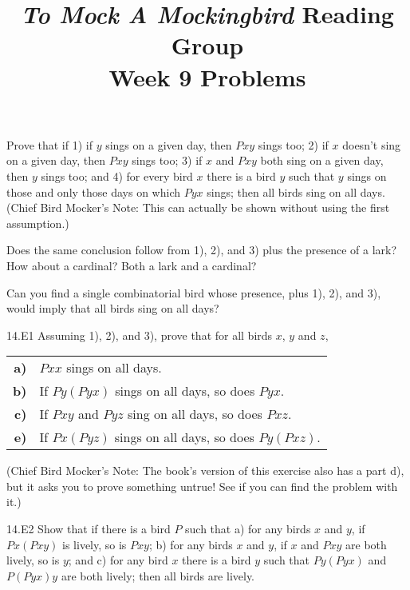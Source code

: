 \documentclass[12pt, letterpaper]{article}
\title{\emph{To Mock A Mockingbird} Reading Group\\Week 9 Problems}
\begin{document}
\maketitle

\begin{prob}{14.1} 
Prove that if 1) if $y$ sings on a given day, then $Pxy$ sings too; 2) if $x$ doesn't sing on a given day, then $Pxy$ sings too; 3) if $x$ and $Pxy$ both sing on a given day, then $y$ sings too; and 4) for every bird $x$ there is a bird $y$ such that $y$ sings on those and only those days on which $Pyx$ sings; then all birds sing on all days. (Chief Bird Mocker's Note: This can actually be shown without using the first assumption.)
\end{prob}

\begin{prob}{14.2} 
Does the same conclusion follow from 1), 2), and 3) plus the presence of a lark? How about a cardinal? Both a lark and a cardinal?
\end{prob}

\begin{prob}{14.3} 
Can you find a single combinatorial bird whose presence, plus 1), 2), and 3), would imply that all birds sing on all days?
\end{prob}

\begin{prob}{14.E1}
Assuming 1), 2), and 3), prove that for all birds $x$, $y$ and $z$, 
\end{prob}

\begin{tabular}{r l}
    \textbf{a)} & $Pxx$ sings on all days. \\
    \textbf{b)} & If $Py(Pyx)$ sings on all days, so does $Pyx$. \\
    \textbf{c)} & If $Pxy$ and $Pyz$ sing on all days, so does $Pxz$. \\
    \textbf{e)} & If $Px(Pyz)$ sings on all days, so does $Py(Pxz)$.
\end{tabular}

\vspace{6pt}
\noindent (Chief Bird Mocker's Note: The book's version of this exercise also has a part d), but it asks you to prove something untrue! See if you can find the problem with it.)

\begin{prob}{14.E2}
Show that if there is a bird $P$ such that a) for any birds $x$ and $y$, if $Px(Pxy)$ is lively, so is $Pxy$; b) for any birds $x$ and $y$, if $x$ and $Pxy$ are both lively, so is $y$; and c) for any bird $x$ there is a bird $y$ such that $Py(Pyx)$ and $P(Pyx)y$ are both lively; then all birds are lively.
\end{prob}
\end{document}
